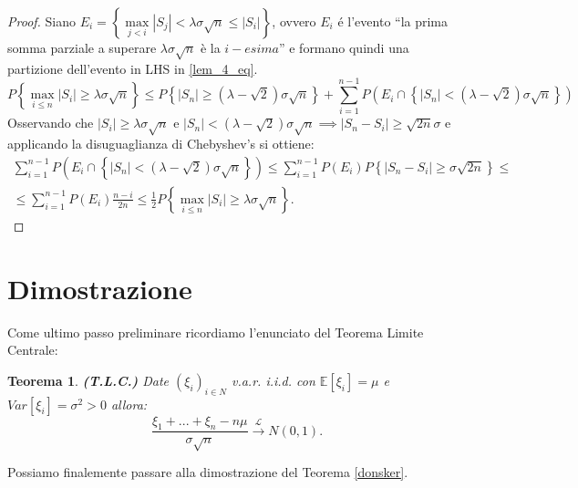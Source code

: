 \documentclass[11pt, twoside]{report}
\theoremstyle{definition}
\theoremstyle{plain}
\newtheorem{teo}{Teorema}[chapter]
\theoremstyle{remark}
\numberwithin{equation}{chapter}
\begin{document}
\begin{proof} Siano $E_i=\left\{\max\limits_{j< i} |S_j| < \lambda \sigma \sqrt n \leq|S_i| \right\}$, ovvero $E_i$ \'e l'evento ``la prima somma parziale a superare $\lambda \sigma \sqrt n$ è la $i-esima$'' e formano quindi una partizione dell'evento in LHS in \eqref{lem_4_eq}.
\begin{equation}
P\left\{\max\limits_{i\leq n}|S_i| \geq \lambda \sigma \sqrt n\right\} \leq  P\left\{ |S_n| \geq (\lambda - \sqrt 2) \sigma \sqrt n \right\} + \sum\limits_{i=1}^{n-1}P\left(E_i \cap \left\{ |S_n|<(\lambda - \sqrt 2) \sigma \sqrt n \right\}\right) \nonumber
\end{equation}
Osservando che $|S_i|\geq \lambda \sigma \sqrt n$ e $|S_n|<(\lambda - \sqrt 2) \sigma \sqrt n \implies |S_n - S_i| \geq \sqrt{2 n} \sigma $ e applicando la disuguaglianza di Chebyshev's si ottiene:
\begin{gather}
\sum\limits_{i=1}^{n-1}P\left(E_i \cap \left\{ |S_n|<(\lambda - \sqrt 2) \sigma \sqrt n \right\}\right) \leq \sum\limits_{i=1}^{n-1}P(E_i) P\left\{|S_n-S_i|\geq  \sigma\sqrt {2 n}  \right\} \leq \nonumber \\
\leq \sum\limits_{i=1}^{n-1}P(E_i)\frac{n-i}{2n} \leq \frac{1}{2}P\left\{\max\limits_{i\leq n}|S_i| \geq \lambda \sigma \sqrt n\right\}.
\end{gather} 

\end{proof}
\section{Dimostrazione}
Come ultimo passo preliminare ricordiamo l'enunciato del Teorema Limite Centrale:

\begin{teo}{\textbf{(T.L.C.)}} Date $(\xi_i)_{i \in N}$ v.a.r. i.i.d. con $\mathbb E [\xi_i]=\mu$ e $Var[\xi_i]=\sigma^2>0$ allora:
$$ \frac{\xi_1+ ... +\xi_n - n \mu}{\sigma \sqrt n}  \xrightarrow{\mathscr{L}} N(0,1).$$
\end{teo}
\bigskip
Possiamo finalemente passare alla dimostrazione del Teorema \ref{donsker}. 
\end{document}

